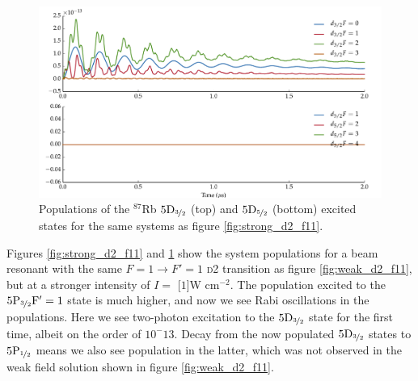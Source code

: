     \begin{figure}%
    \includegraphics[width=\linewidth]
        {figs/05_twophoton/rb87_5spd_hf_solve_b3_fig2.pdf}
    \caption{
    Populations of the $^{87}$Rb $5\rm{D}_{\nicefrac{3}{2}}$ (top) and
    $5\rm{D}_{\nicefrac{5}{2}}$ (bottom) excited states for the same systems as
    figure \ref{fig:strong_d2_f11}.
    }
    \label{fig:strong_d2_f11_D} 
    \end{figure}

    Figures \ref{fig:strong_d2_f11} and \ref{fig:strong_d2_f11_D} show the
    system populations for a beam resonant with the same $F = 1 \rightarrow F' =
    1$ \textsc{d2} transition as figure \ref{fig:weak_d2_f11}, but at a stronger
    intensity of $I = $ \unit[$1$]{W cm$^{-2}$}. The population excited to the
    $5\rm{P}_{\nicefrac{3}{2}} F' = 1$ state is much higher, and now we see Rabi
    oscillations in the populations. Here we see two-photon excitation to the
    $5\rm{D}_{\nicefrac{3}{2}}$ state for the first time, albeit on the order of
    $10^-{13}$. Decay from the now populated $5\rm{D}_{\nicefrac{3}{2}}$ states
    to $5\rm{P}_{\nicefrac{1}{2}}$ means we also see population in the latter,
    which was not observed in the weak field solution shown in figure
    \ref{fig:weak_d2_f11}.

